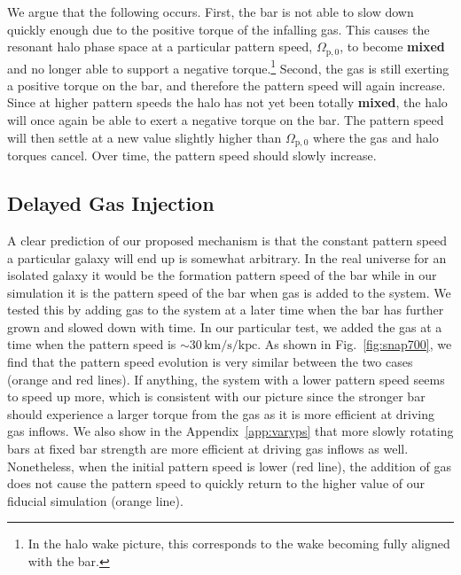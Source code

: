 \documentclass[twocolumn,linenumbers,trackchanges]{aastex631}
\begin{document}
We argue that the following occurs. First, the bar is not able to slow down
quickly enough due to the positive torque of the infalling gas. This causes the
resonant halo phase space at a particular pattern speed,
$\Omega_{\textrm{p},0}$, to become {\bf mixed} and no longer able to support a
negative torque.\footnote{In the halo wake picture, this corresponds to the wake
becoming fully aligned with the bar.} Second, the gas is still exerting a
positive torque on the bar, and therefore the pattern speed will again increase.
Since at higher pattern speeds the halo has not yet been totally {\bf mixed},
the halo will once again be able to exert a negative torque on the bar. The
pattern speed will then settle at a new value slightly higher than
$\Omega_{\textrm{p},0}$ where the gas and halo torques cancel. Over time, the
pattern speed should slowly increase.

\subsection{Delayed Gas Injection}
A clear prediction of our proposed mechanism is that the constant pattern speed
a particular galaxy will end up is somewhat arbitrary. In the real universe for
an isolated galaxy it would be the formation pattern speed of the bar while in
our simulation it is the pattern speed of the bar when gas is added to the
system. We tested this by adding gas to the system at a later time when the bar
has further grown and slowed down with time. In our particular test, we added
the gas at a time when the pattern speed is
$\sim30\,\textrm{km}/\textrm{s}/\textrm{kpc}$. As shown in
Fig.~\ref{fig:snap700}, we find that the pattern speed evolution is very similar
between the two cases (orange and red lines). If anything, the system with a
lower pattern speed seems to speed up more, which is consistent with our picture
since the stronger bar should experience a larger torque from the gas as it is
more efficient at driving gas inflows. We also show in the
Appendix~\ref{app:varyps} that more slowly rotating bars at fixed bar strength
are more efficient at driving gas inflows as well. Nonetheless, when the initial
pattern speed is lower (red line), the addition of gas does not cause the
pattern speed to quickly return to the higher value of our fiducial simulation
(orange line).
\end{document}
